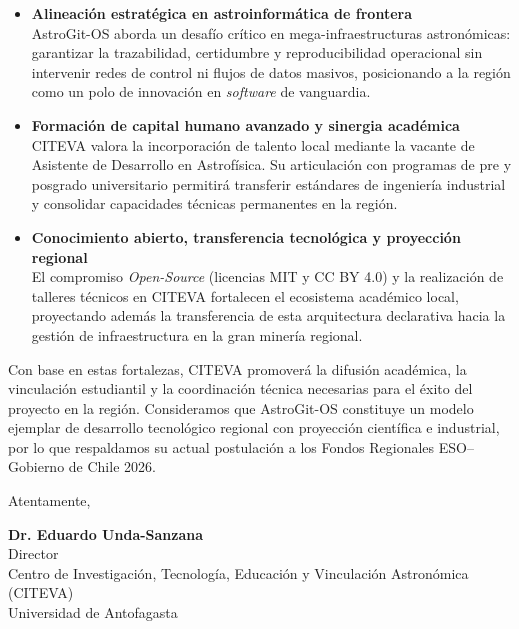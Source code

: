 \documentclass[letterpaper,11pt]{article}
\begin{document}
\vspace{-2mm}
\begin{itemize}
    \item \textbf{Alineación estratégica en astroinformática de frontera} \\
    AstroGit-OS aborda un desafío crítico en mega-infraestructuras astronómicas: garantizar la trazabilidad, certidumbre y reproducibilidad operacional sin intervenir redes de control ni flujos de datos masivos, posicionando a la región como un polo de innovación en \textit{software} de vanguardia.    
    \item \textbf{Formación de capital humano avanzado y sinergia académica} \\
    CITEVA valora la incorporación de talento local mediante la vacante de Asistente de Desarrollo en Astrofísica. Su articulación con programas de pre y posgrado universitario permitirá transferir estándares de ingeniería industrial y consolidar capacidades técnicas permanentes en la región.    
    \item \textbf{Conocimiento abierto, transferencia tecnológica y proyección regional} \\El compromiso \textit{Open-Source} (licencias MIT y CC BY 4.0) y la realización de talleres técnicos en CITEVA fortalecen el ecosistema académico local, proyectando además la transferencia de esta arquitectura declarativa hacia la gestión de infraestructura en la gran minería regional.
\end{itemize}

Con base en estas fortalezas, CITEVA promoverá la difusión académica, la vinculación estudiantil y la coordinación técnica necesarias para el éxito del proyecto en la región. Consideramos que AstroGit-OS constituye un modelo ejemplar de desarrollo tecnológico regional con proyección científica e industrial, por lo que respaldamos su actual postulación a los Fondos Regionales ESO–Gobierno de Chile 2026.

\vspace{0.6cm}

Atentamente,

\vspace{1.5cm}
\begin{center}
    \begin {minipage} {.8\textwidth}
        \centering \color{primary} \textbf {Dr. Eduardo Unda-Sanzana}\\
        Director\\
        Centro de Investigación, Tecnología, Educación y Vinculación Astronómica (CITEVA)\\
        Universidad de Antofagasta\\
    \end{minipage}
\end{center}
\end{document}
